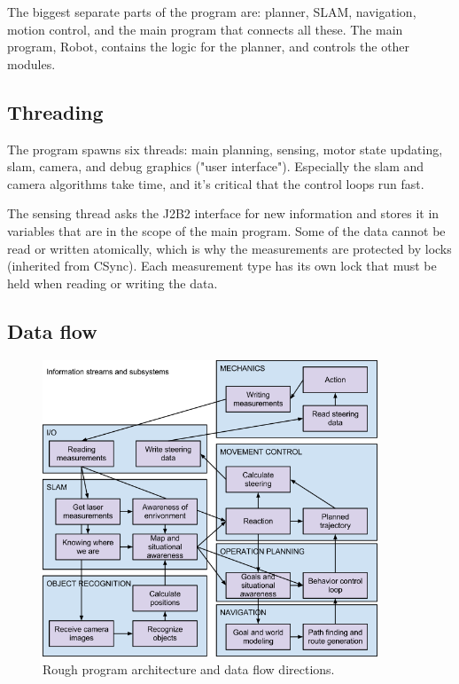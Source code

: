 \documentclass[a4paper,10pt]{article}
\begin{document}
The biggest separate parts of the program are: planner, SLAM, navigation, motion control, and the main program that connects all these. The main program, Robot, contains the logic for the planner, and controls the other modules.

\subsection{Threading}

The program spawns six threads: main planning, sensing, motor state updating, slam, camera, and debug graphics ("user interface"). Especially the slam and camera algorithms take time, and it’s critical that the control loops run fast.

The sensing thread asks the J2B2 interface for new information and stores it in variables that are in the scope of the main program. Some of the data cannot be read or written atomically, which is why the measurements are protected by locks (inherited from CSync). Each measurement type has its own lock that must be held when reading or writing the data.

\subsection{Data flow}

\begin{figure}[h]	%
\begin{center}
\includegraphics[width=10.0cm]{architecture.png}
\caption{Rough program architecture and data flow directions.}
\label{softwarearch} %
\end{center}
\end{figure}
\end{document}

